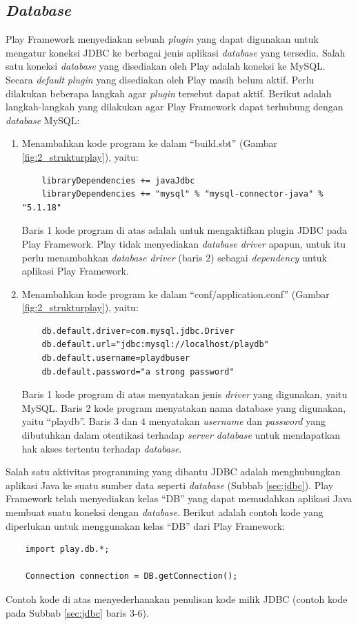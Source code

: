 \subsection{\textit{Database}}
\label{sec:database}
Play Framework menyediakan sebuah \textit{plugin} yang dapat digunakan untuk mengatur koneksi JDBC ke berbagai jenis aplikasi \textit{database} yang tersedia\cite{playframeworkweb}. Salah satu koneksi \textit{database} yang disediakan oleh Play adalah koneksi ke MySQL. Secara \textit{default} \textit{plugin} yang disediakan oleh Play masih belum aktif. Perlu dilakukan beberapa langkah agar \textit{plugin} tersebut dapat aktif. Berikut adalah langkah-langkah yang dilakukan agar Play Framework dapat terhubung dengan \textit{database} MySQL:
\begin{enumerate}
	\item Menambahkan kode program ke dalam ``build.sbt'' (Gambar \ref{fig:2_strukturplay}), yaitu:
	
	\begin{lstlisting}
	libraryDependencies += javaJdbc
	libraryDependencies += "mysql" % "mysql-connector-java" % "5.1.18"
	\end{lstlisting}
	
	Baris 1 kode program di atas adalah untuk mengaktifkan plugin JDBC pada Play Framework. Play tidak menyediakan \textit{database driver} apapun, untuk itu perlu menambahkan \textit{database driver} (baris 2) sebagai \textit{dependency} untuk aplikasi Play Framework.
	
	\item Menambahkan kode program ke dalam ``conf/application.conf'' (Gambar \ref{fig:2_strukturplay}), yaitu:
	
	\begin{lstlisting}
	db.default.driver=com.mysql.jdbc.Driver
	db.default.url="jdbc:mysql://localhost/playdb"
	db.default.username=playdbuser
	db.default.password="a strong password"
	\end{lstlisting}
	
	Baris 1 kode program di atas menyatakan jenis \textit{driver} yang digunakan, yaitu MySQL. Baris 2 kode program menyatakan nama database yang digunakan, yaitu ``playdb''. Baris 3 dan 4 menyatakan \textit{username} dan \textit{password} yang dibutuhkan dalam otentikasi terhadap \textit{server database} untuk mendapatkan hak akses tertentu terhadap \textit{database}.
\end{enumerate}

	Salah satu aktivitas programming yang dibantu JDBC adalah menghubungkan aplikasi Java ke suatu sumber data seperti \textit{database} (Subbab \ref{sec:jdbc}). Play Framework telah menyediakan kelas ``DB'' yang dapat memudahkan aplikasi Java membuat suatu koneksi dengan \textit{database}. Berikut adalah contoh kode yang diperlukan untuk menggunakan kelas ``DB'' dari Play Framework:
	\begin{lstlisting}
	import play.db.*;

	Connection connection = DB.getConnection();
	\end{lstlisting}
	Contoh kode di atas menyederhanakan penulisan kode milik JDBC (contoh kode pada Subbab \ref{sec:jdbc} baris 3-6). 
	
